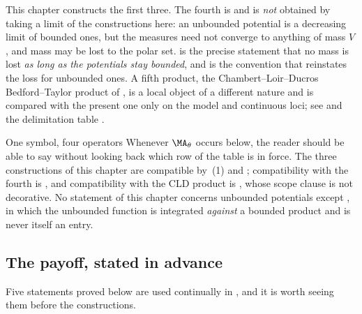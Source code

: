 This chapter constructs the first three.  The fourth is
 and is \emph{not} obtained by taking a limit of the
constructions here: an unbounded potential is a decreasing limit of bounded
ones, but the measures need not converge to anything of mass \(V\), and mass
may be lost to the polar set.   is the
precise statement that no mass is lost \emph{as long as the potentials stay
bounded}, and  is the convention that
reinstates the loss for unbounded ones.  A fifth product, the
Chambert--Loir--Ducros Bedford--Taylor product of ,
is a local object of a different nature and is compared with the present one
only on the model and continuous loci; see
 and the delimitation table
.

\begin{warning}{One symbol, four operators}
Whenever \(\MA_\theta\) occurs below, the reader should be able to say
without looking back which row of the table is in force.  The three
constructions of this chapter are compatible by
\,(1) and
; compatibility with the fourth is
, and compatibility with the CLD product is
, whose scope clause is not decorative.
No statement of this chapter concerns unbounded potentials except
, in which the unbounded function is
integrated \emph{against} a bounded product and is never itself an entry.
\end{warning}

\subsection{The payoff, stated in advance}
\label{sec:ch24-payoff}

Five statements proved below are used continually in
, and it is worth seeing them
before the constructions.


